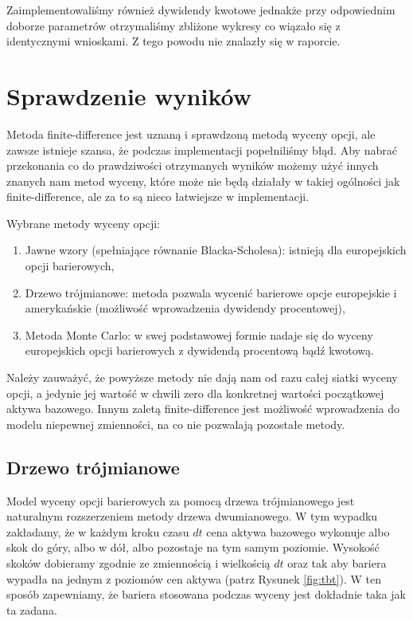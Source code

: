 \documentclass[12pt]{article}
\begin{document}
Zaimplementowaliśmy również dywidendy kwotowe jednakże przy odpowiednim doborze parametrów otrzymaliśmy zbliżone wykresy co wiązało się z identycznymi wnioskami. Z tego powodu nie znalazły się w raporcie.



\section{Sprawdzenie wyników}
Metoda finite-difference jest uznaną i sprawdzoną metodą wyceny opcji, ale zawsze istnieje szansa, że podczas implementacji popełniliśmy błąd. Aby nabrać przekonania co do prawdziwości otrzymanych wyników możemy użyć innych znanych nam metod wyceny, które może nie będą działały w takiej ogólności jak finite-difference, ale za to są nieco łatwiejsze w implementacji.

Wybrane metody wyceny opcji:
\begin{enumerate}
    \item Jawne wzory (spełniające równanie Blacka-Scholesa): istnieją dla europejskich opcji barierowych,
    \item Drzewo trójmianowe: metoda pozwala wycenić barierowe opcje europejskie i amerykańskie (możliwość wprowadzenia dywidendy procentowej),
    \item Metoda Monte Carlo: w swej podstawowej formie nadaje się do wyceny europejskich opcji barierowych z dywidendą procentową bądź kwotową.
\end{enumerate}

Należy zauważyć, że powyższe metody nie dają nam od razu całej siatki wyceny opcji, a jedynie jej wartość w chwili zero dla konkretnej wartości początkowej aktywa bazowego. Innym zaletą finite-difference jest możliwość wprowadzenia do modelu niepewnej zmienności, na co nie pozwalają pozostałe metody.

\subsection{Drzewo trójmianowe}

Model wyceny opcji barierowych za pomocą drzewa trójmianowego jest naturalnym rozszerzeniem metody drzewa dwumianowego. W tym wypadku zakładamy, że w każdym kroku czasu \(dt\) cena aktywa bazowego wykonuje albo skok do góry, albo w dół, albo pozostaje na tym samym poziomie. Wysokość skoków dobieramy zgodnie ze zmiennością i wielkością \(dt\) oraz tak aby bariera wypadła na jednym z poziomów cen aktywa (patrz Rysunek \ref{fig:tbt}). W ten sposób zapewniamy, że bariera stosowana podczas wyceny jest dokładnie taka jak ta zadana. 
\end{document}
